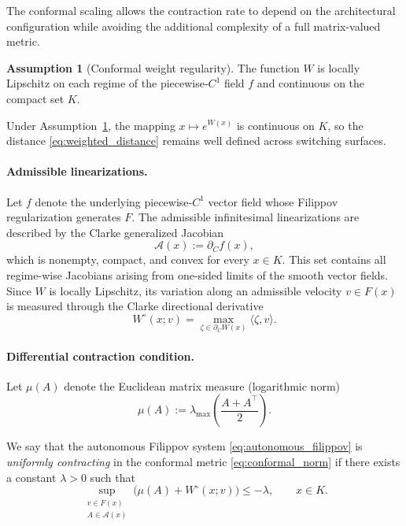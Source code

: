 \documentclass[12pt]{article}
\theoremstyle{plain}
\theoremstyle{definition}
\newtheorem{assumption}[theorem]{Assumption}
\theoremstyle{remark}
\begin{document}
The conformal scaling allows the contraction rate to depend on
the architectural configuration while avoiding the additional
complexity of a full matrix-valued metric.

\begin{assumption}[Conformal weight regularity]
\label{ass:weight_regularity}
The function $W$ is locally Lipschitz on each regime of the
piecewise-$C^1$ field $f$ and continuous on the compact set $K$.
\end{assumption}

Under Assumption~\ref{ass:weight_regularity},
the mapping $x\mapsto e^{W(x)}$ is continuous on $K$,
so the distance \eqref{eq:weighted_distance} remains well
defined across switching surfaces.

\paragraph{Admissible linearizations.}

Let $f$ denote the underlying piecewise-$C^1$ vector field whose
Filippov regularization generates $F$.
The admissible infinitesimal linearizations are described by the
Clarke generalized Jacobian
\begin{equation}
\mathcal A(x):=\partial_C f(x),
\label{eq:generalized_jacobian}
\end{equation}
which is nonempty, compact, and convex for every $x\in K$.
This set contains all regime-wise Jacobians arising from
one-sided limits of the smooth vector fields. Since $W$ is locally Lipschitz, its variation along an admissible
velocity $v\in F(x)$ is measured through the Clarke directional
derivative
\begin{equation}
W^\circ(x;v)
=
\max_{\zeta\in\partial_C W(x)}
\langle\zeta,v\rangle .
\label{eq:W_clarke}
\end{equation}

\paragraph{Differential contraction condition.}

Let $\mu(A)$ denote the Euclidean matrix measure
(logarithmic norm)
\begin{equation}
\mu(A)
:=
\lambda_{\max}\!\left(\frac{A+A^\top}{2}\right).
\label{eq:matrix_measure}
\end{equation}

We say that the autonomous Filippov system
\eqref{eq:autonomous_filippov}
is \emph{uniformly contracting} in the conformal metric
\eqref{eq:conformal_norm} if there exists a constant
$\lambda>0$ such that
\begin{equation}
\sup_{\substack{v\in F(x)\\A\in\mathcal A(x)}}
\big(
\mu(A)+W^\circ(x;v)
\big)
\le -\lambda,
\qquad x\in K .
\label{eq:contraction_condition}
\end{equation}
\end{document}
